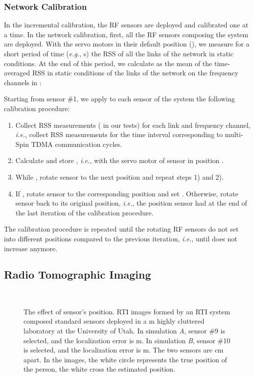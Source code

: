 \documentclass[conference]{IEEEtran}
\begin{document}
\subsubsection{Network Calibration}
\label{sec:network_calibration}

In the incremental calibration, the RF sensors are deployed and calibrated one at a time. In the network calibration, first, all the RF sensors composing the system are deployed. With the servo motors in their default position (),  we measure for a short period of time (\emph{e.g.},  s) the RSS of all the  links of the network in static conditions. At the end of this period, we calculate  as the mean of the time-averaged RSS in static conditions of the  links of the network on the frequency channels in :
    
Starting from sensor \#1, we apply to each sensor  of the system the following calibration procedure:
\begin{enumerate}
    \item Collect  RSS measurements ( in our tests) for each link and frequency channel, \emph{i.e.}, collect RSS measurements for the time interval corresponding to  multi-Spin TDMA communication cycles.
    \item Calculate and store , \emph{i.e.},  with the servo motor of sensor  in position .
\item While , rotate sensor  to the next position and repeat steps 1) and 2).
    \item If , rotate sensor  to the corresponding position  and set . Otherwise, rotate sensor  back to its original position, \emph{i.e.}, the position sensor  had at the end of the last iteration of the calibration procedure.
\end{enumerate}
The calibration procedure is repeated until the rotating RF sensors do not set into different positions compared to the previous iteration, \emph{i.e.}, until  does not increase anymore.



\subsection{Radio Tomographic Imaging}
\label{sec:RTI}

\begin{figure*}[t]
    \begin{center}
        \mbox{
             \quad
        }
        \caption{The effect of sensor's position. RTI images formed by an RTI system composed  standard sensors deployed in a  m highly cluttered laboratory at the University of Utah. In simulation \emph{A}, sensor \#9 is selected, and the localization error is  m. In simulation \emph{B}, sensor \#10 is selected, and the localization error is  m. The two sensors are  cm apart. In the images, the white circle represents the true position of the person, the white cross the estimated position.}
        \label{fig:RTI_comparison}
    \end{center}
\end{figure*}
\end{document}
